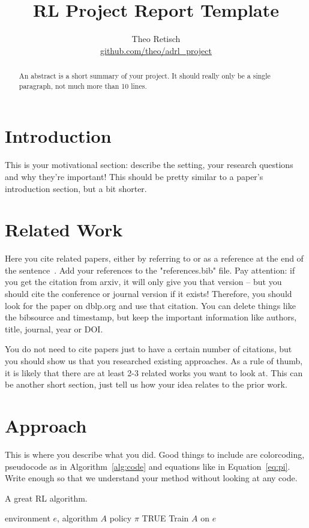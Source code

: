 \documentclass{article}
\title{RL Project Report Template}
\author{Theo Retisch \\ \url{github.com/theo/adrl_project}}
\begin{document}
\maketitle
\begin{abstract}
    An abstract is a short summary of your project. It should really only be a single paragraph, not much more than 10 lines.
\end{abstract}
\section{Introduction}
This is your motivational section: describe the setting, your research questions and why they're important! This should be pretty similar to a paper's introduction section, but a bit shorter.

\section{Related Work}
Here you cite related papers, either by referring to \cite{parkerholder-jair22} or as a reference at the end of the sentence~\citep{parkerholder-jair22}. 
Add your references to the "references.bib" file. 
Pay attention: if you get the citation from arxiv, it will only give you that version -- but you should cite the conference or journal version if it exists! 
Therefore, you should look for the paper on dblp.org and use that citation. 
You can delete things like the bibsource and timestamp, but keep the important information like authors, title, journal, year or DOI.

You do not need to cite papers just to have a certain number of citations, but you should show us that you researched existing approaches. As a rule of thumb, it is likely that there are at least 2-3 related works you want to look at. This can be another short section, just tell us how your idea relates to the prior work.

\section{Approach}
This is where you describe what you did. Good things to include are {\color{orange} colorcoding}, pseudocode as in Algorithm~\ref{alg:code} and equations like in Equation~\ref{eq:pi}.
Write enough so that we understand your method without looking at any code.

\begin{algorithm}[H]
    \caption{A great RL algorithm.}
    \label{alg:code}
    \begin{algorithmic}
        \Require environment $e$, algorithm $A$
        \Return policy $\pi$
        \While TRUE
            \State Train $A$ on $e$
        \EndWhile
    \end{algorithmic}
\end{algorithm}
\end{document}
